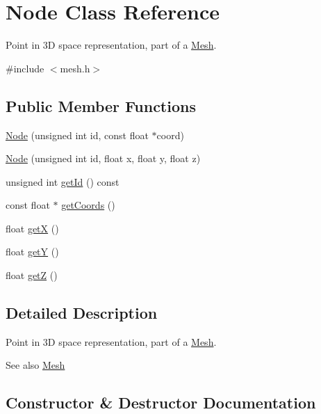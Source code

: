 \hypertarget{classNode}{}\section{Node Class Reference}
\label{classNode}


Point in 3D space representation, part of a \hyperlink{classMesh}{Mesh}.  




{\ttfamily \#include $<$mesh.\+h$>$}

\subsection*{Public Member Functions}
\begin{DoxyCompactItemize}
\item 
\hyperlink{classNode_a232677901f5187ef510360008d8cf3e0}{Node} (unsigned int id, const float $\ast$coord)
\item 
\hyperlink{classNode_acf01ac83ce5412472a26220fe1cdc748}{Node} (unsigned int id, float x, float y, float z)
\item 
unsigned int \hyperlink{classNode_af9b4c1c72ce14b69f5e99deb4440f489}{get\+Id} () const
\item 
const float $\ast$ \hyperlink{classNode_ad1fb25b09446913847578ab0b8de6cdb}{get\+Coords} ()
\item 
float \hyperlink{classNode_a98ba03ab2272a479d3173932a40c3a41}{getX} ()
\item 
float \hyperlink{classNode_a55366d94e5244071158b45b31c43dd8b}{getY} ()
\item 
float \hyperlink{classNode_ad275f03c5bf56c9ec572ff1da10bb34c}{getZ} ()
\end{DoxyCompactItemize}


\subsection{Detailed Description}
Point in 3D space representation, part of a \hyperlink{classMesh}{Mesh}. 

\begin{DoxySeeAlso}{See also}
\hyperlink{classMesh}{Mesh} 
\end{DoxySeeAlso}


\subsection{Constructor \& Destructor Documentation}
\mbox{\label{classNode_a232677901f5187ef510360008d8cf3e0}} 
